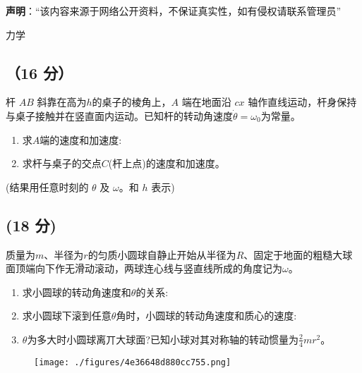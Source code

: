
\textbf{声明}：“该内容来源于网络公开资料，不保证真实性，如有侵权请联系管理员”

力学
\subsection{（16 分）}
杆 $AB$ 斜靠在高为$h$的桌子的棱角上，$A$ 端在地面沿 $cx$ 轴作直线运动，杆身保持与桌子接触并在竖直面内运动。已知杆的转动角速度$\dot{\theta}=\omega_{0}$为常量。
\begin{enumerate}
\item 求$A$端的速度和加速度:
\item 求杆与桌子的交点$C$(杆上点)的速度和加速度。
\end{enumerate}
(结果用任意时刻的 $\theta$ 及 $\omega$。和 $h$ 表示)
\subsection{(18 分)}
质量为$m$、半径为$r$的匀质小圆球自静止开始从半径为$R$、固定于地面的粗糙大球面顶端向下作无滑动滚动，两球连心线与竖直线所成的角度记为$\omega$。
\begin{enumerate}
\item 求小圆球的转动角速度和$\theta$的关系:
\item 求小圆球下滚到任意$\theta$角时，小圆球的转动角速度和质心的速度:
\item $\theta$为多大时小圆球离丌大球面?已知小球对其对称轴的转动惯量为$\frac{2}{4}mr^2$。
\end{enumerate}
\begin{figure}[ht]
\centering
\texttt{[image: ./figures/4e36648d880cc755.png]}
\caption{} \label{fig_PKU004_1}
\end{figure}